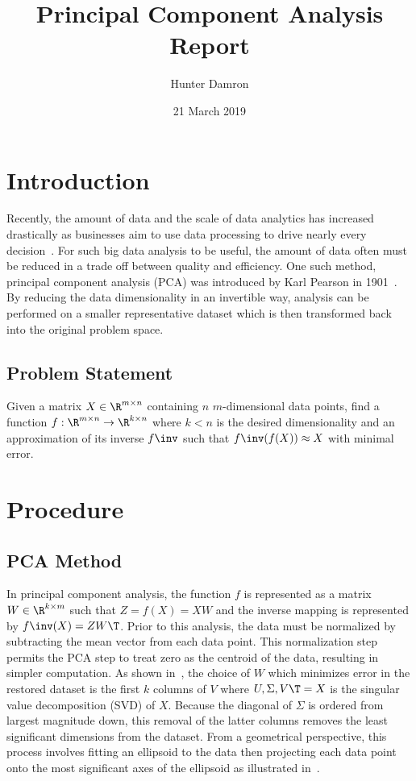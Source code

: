 \documentclass{article}
\title{Principal Component Analysis Report}
\author{Hunter Damron}
\date{21 March 2019}
\begin{document}
	\maketitle


	\section{Introduction}
		Recently, the amount of data and the scale of data analytics has increased drastically as businesses aim to use data processing to drive nearly every decision~\cite{bigdata}. For such big data analysis to be useful, the amount of data often must be reduced in a trade off between quality and efficiency. One such method, principal component analysis (PCA) was introduced by Karl Pearson in 1901~\cite{pearson}. By reducing the data dimensionality in an invertible way, analysis can be performed on a smaller representative dataset which is then transformed back into the original problem space.

	\subsection{Problem Statement}
		Given a matrix $X \in \R^{m \times n}$ containing $n$ $m$-dimensional data points, find a function $f : \R^{m \times n} \to \R^{k \times n}$ where $k < n$ is the desired dimensionality and an approximation of its inverse $f\inv$ such that $f\inv (f(X)) \approx X$ with minimal error.

	\section{Procedure}
	\subsection{PCA Method}
		In principal component analysis, the function $f$ is represented as a matrix $W \in \R^{k \times m}$ such that $Z = f(X) = XW$ and the inverse mapping is represented by $f\inv(X) = ZW\T$. Prior to this analysis, the data must be normalized by subtracting the mean vector from each data point. This normalization step permits the PCA step to treat zero as the centroid of the data, resulting in simpler computation. As shown in~\cite{notes}, the choice of $W$ which minimizes error in the restored dataset is the first $k$ columns of $V$ where $U, \Sigma, V\T = X$ is the singular value decomposition (SVD) of $X$. Because the diagonal of $\Sigma$ is ordered from largest magnitude down, this removal of the latter columns removes the least significant dimensions from the dataset. From a geometrical perspective, this process involves fitting an ellipsoid to the data then projecting each data point onto the most significant axes of the ellipsoid as illustrated in~\cite{pearson}.
\end{document}
